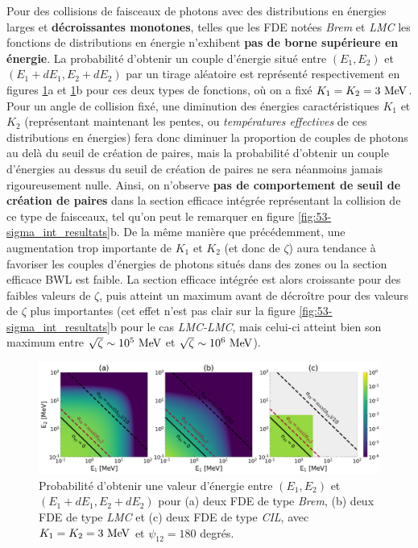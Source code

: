 \begin{refsection}
Pour des collisions de faisceaux de photons avec des distributions en énergies larges et \textbf{décroissantes monotones}, telles que les FDE notées \textit{Brem} et \textit{LMC} les fonctions de distributions en énergie n'exhibent \textbf{pas de borne supérieure en énergie}. La probabilité d'obtenir un couple d'énergie situé entre $(E_1,E_2)$ et $(E_1+dE_1, E_2+dE_2)$ par un tirage aléatoire est représenté respectivement en figures \ref{fig:53-exemples_FDE}a et \ref{fig:53-exemples_FDE}b pour ces deux types de fonctions, où on a fixé $K_1=K_2=3 ~ \rm MeV$. Pour un angle de collision fixé, une diminution des énergies caractéristiques $K_1$ et $K_2$ (représentant maintenant les pentes, ou \textit{températures effectives} de ces distributions en énergies) fera donc diminuer la proportion de couples de photons au delà du seuil de création de paires, mais la probabilité d'obtenir un couple d'énergies au dessus du seuil de création de paires ne sera néanmoins jamais rigoureusement nulle. Ainsi, on n'observe \textbf{pas de comportement de seuil de création de paires} dans la section efficace intégrée représentant la collision de ce type de faisceaux, tel qu'on peut le remarquer en figure \ref{fig:53-sigma_int_resultats}b. De la même manière que précédemment, une augmentation trop importante de $K_1$ et $K_2$ (et donc de $\zeta$) aura tendance à favoriser les couples d'énergies de photons situés dans des zones ou la section efficace BWL est faible. La section efficace intégrée est alors croissante pour des faibles valeurs de $\zeta$, puis atteint un maximum avant de décroître pour des valeurs de $\zeta$ plus importantes (cet effet n'est pas clair sur la figure \ref{fig:53-sigma_int_resultats}b pour le cas \textit{LMC-LMC}, mais celui-ci atteint bien son maximum entre $\sqrt{\zeta} \sim 10^5 ~ \rm MeV$ et $\sqrt{\zeta} \sim 10^6 ~ \rm MeV$).

\begin{figure}[hbtp]
	\centering
	\includegraphics[width=\linewidth]{5-opti_theorique/exemples_FDE.png}
	\caption{Probabilité d'obtenir une valeur d'énergie entre $(E_1,E_2)$ et $(E_1+dE_1, E_2+dE_2)$ pour (a) deux FDE de type \textit{Brem}, (b) deux FDE de type \textit{LMC} et (c) deux FDE de type \textit{CIL}, avec $K_1=K_2=3 ~ \rm MeV$ et $\psi_{12}=180$ degrés.}
	\label{fig:53-exemples_FDE}
\end{figure}


\end{refsection}
